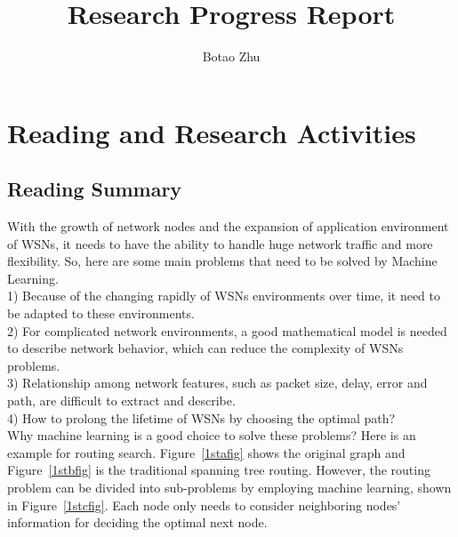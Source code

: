 \documentclass[11pt]{report}
\title{Research Progress Report}
\author{Botao Zhu}
\begin{document}
	
	\maketitle
	 \chead{} 
	 \cfoot{} 
	\renewcommand{\footrulewidth}{1.0pt}
	\renewcommand{\headrulewidth}{2.0pt}
	\renewcommand{\arraystretch}{1.3}
	\pagestyle{fancy}
	
	\renewcommand{\thesection}{\arabic{section}}
	
	\section{Reading and Research Activities}
	
	\subsection{Reading Summary}
	With the growth of network nodes and the expansion of application environment of WSNs, it needs to have the ability to handle huge network traffic and more flexibility. So, here are some main problems that need to be solved by Machine Learning.\\
	1) Because of  the changing rapidly of WSNs environments over time, it need to be adapted to these environments.\\
	2) For complicated network environments, a good mathematical model is needed to describe network behavior, which can reduce the complexity of WSNs problems.\\
	3) Relationship among network features, such as packet size, delay, error and path, are difficult to extract and describe.\\
	4) How to prolong the lifetime of WSNs by choosing the optimal path?\\
	
	\noindent Why machine learning is a good choice to solve these problems? Here is an example for routing search. Figure~\ref{1stafig} shows the original graph and Figure~\ref{1stbfig} is the traditional spanning tree routing. However, the routing problem can be divided into sub-problems by employing machine learning, shown in Figure~\ref{1stcfig}. Each node only needs to consider neighboring nodes' information  for deciding the optimal next node. 
	
\end{document}

